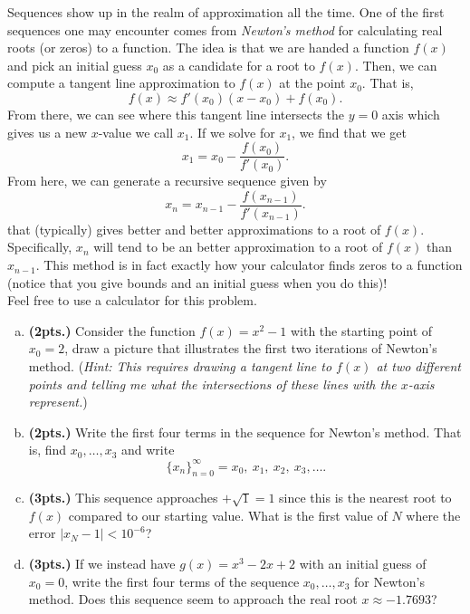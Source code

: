 \documentclass[12pt]{amsbook}
\begin{document}
\newpage
\begin{problem}
Sequences show up in the realm of approximation all the time.  One of the first sequences one may encounter comes from \emph{Newton's method} for calculating real roots (or zeros) to a function.  The idea is that we are handed a function $f(x)$ and pick an initial guess $x_0$ as a candidate for a root to $f(x)$. Then, we can compute a tangent line approximation to $f(x)$ at the point $x_0$. That is,
\[
f(x)\approx f'(x_0)(x-x_0)+f(x_0).
\]
From there, we can see where this tangent line intersects the $y=0$ axis which gives us a new $x$-value we call $x_1$.  If we solve for $x_1$, we find that we get
\[
x_1 = x_0 -\frac{f(x_0)}{f'(x_0)}.
\]
From here, we can generate a recursive sequence given by
\[
x_{n}=x_{n-1}-\frac{f(x_{n-1})}{f'(x_{n-1})}.
\]
that (typically) gives better and better approximations to a root of $f(x)$. Specifically, $x_n$ will tend to be an better approximation to a root of $f(x)$ than $x_{n-1}$. This method is in fact exactly how your calculator finds zeros to a function (notice that you give bounds and an initial guess when you do this)!\\

\noindent Feel free to use a calculator for this problem.
\begin{enumerate}[(a)]
    \item \textbf{(2pts.)} Consider the function $f(x)=x^2-1$ with the starting point of $x_0=2$, draw a picture that illustrates the first two iterations of Newton's method. (\emph{Hint: This requires drawing a tangent line to $f(x)$ at two different points and telling me what the intersections of these lines with the $x$-axis represent.})
    \item \textbf{(2pts.)} Write the first four terms in the sequence for Newton's method. That is, find $x_0,\dots,x_3$ and write
    \[
    \{x_n\}_{n=0}^\infty = x_0,~x_1,~x_2,~x_3,\dots.
    \]
    \item \textbf{(3pts.)} This sequence approaches $+\sqrt{1}=1$ since this is the nearest root to $f(x)$ compared to our starting value. What is the first value of $N$ where the error $|x_N-1|<10^{-6}$? 
    \item \textbf{(3pts.)} If we instead have $g(x)=x^3-2x+2$ with an initial guess of $x_0=0$, write the first four terms of the sequence $x_0,\dots,x_3$ for Newton's method. Does this sequence seem to approach the real root $x\approx -1.7693$?
\end{enumerate}
\end{problem}
\end{document}
